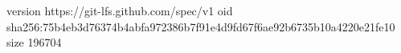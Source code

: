 version https://git-lfs.github.com/spec/v1
oid sha256:75b4eb3d76374b4abfa972386b7f91e4d9fd67f6ae92b6735b10a4220e21fe10
size 196704
